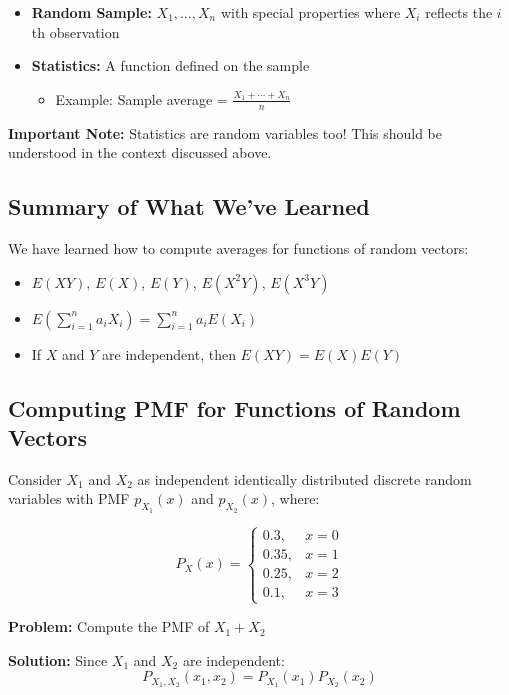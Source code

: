 \documentclass{article}
\begin{document}
    \begin{itemize}
        \item \textbf{Random Sample:} $X_1, \ldots, X_n$ with special properties where $X_i$ reflects the $i$th observation
        \item \textbf{Statistics:} A function defined on the sample
        \begin{itemize}
            \item Example: Sample average = $\frac{X_1 + \cdots + X_n}{n}$
        \end{itemize}
    \end{itemize}
    
        
    \textbf{Important Note:} Statistics are random variables too! This should be understood in the context discussed above.

    \subsection*{Summary of What We've Learned}
    We have learned how to compute averages for functions of random vectors:

    \begin{itemize}
        \item $E(XY)$, $E(X)$, $E(Y)$, $E(X^2Y)$, $E(X^3Y)$
        \item $E(\sum_{i=1}^n a_i X_i) = \sum_{i=1}^n a_i E(X_i)$
        \item If $X$ and $Y$ are independent, then $E(XY) = E(X)E(Y)$
    \end{itemize}

    \subsection*{Computing PMF for Functions of Random Vectors}

    Consider $X_1$ and $X_2$ as independent identically distributed discrete random variables with PMF $p_{X_1}(x)$ and $p_{X_2}(x)$, where:

    \[
    P_X(x) = 
    \begin{cases}
        0.3, & x = 0 \\
        0.35, & x = 1 \\
        0.25, & x = 2 \\
        0.1, & x = 3
    \end{cases}
    \]

    \textbf{Problem:} Compute the PMF of $X_1 + X_2$

    \textbf{Solution:} Since $X_1$ and $X_2$ are independent:
    \[P_{X_1,X_2}(x_1,x_2) = P_{X_1}(x_1)P_{X_2}(x_2)\]
\end{document}
